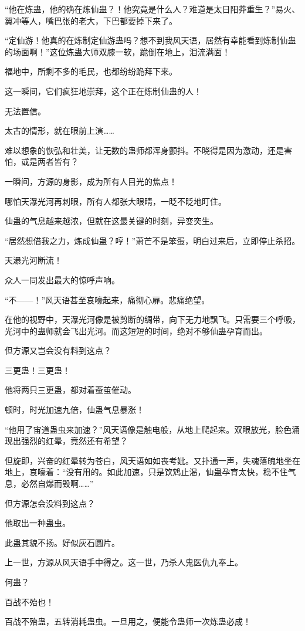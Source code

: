 \begin{this_body}
“他在炼蛊，他的确在炼仙蛊？！他究竟是什么人？难道是太日阳莽重生？”易火、翼冲等人，嘴巴张的老大，下巴都要掉下来了。

“定仙游！他真的在炼制定仙游蛊吗？想不到我风天语，居然有幸能看到炼制仙蛊的场面啊！”这位炼蛊大师双膝一软，跪倒在地上，泪流满面！

福地中，所剩不多的毛民，也都纷纷跪拜下来。

这一瞬间，它们疯狂地崇拜，这个正在炼制仙蛊的人！

无法置信。

太古的情形，就在眼前上演……

难以想象的恢弘和壮美，让无数的蛊师都浑身颤抖。不晓得是因为激动，还是害怕，或是两者皆有？

一瞬间，方源的身影，成为所有人目光的焦点！

哪怕天瀑光河再刺眼，所有人都张大眼睛，一眨不眨地盯住。

仙蛊的气息越来越浓，但就在这最关键的时刻，异变突生。

“居然想借我之力，炼成仙蛊？哼！”萧芒不是笨蛋，明白过来后，立即停止杀招。

天瀑光河断流！

众人一同发出最大的惊呼声响。

“不——！”风天语甚至哀嚎起来，痛彻心扉。悲痛绝望。

在他的视野中，天瀑光河像是被剪断的绸带，向下无力地飘飞。只需要三个呼吸，光河中的蛊师就会飞出光河。而这短短的时间，绝对不够仙蛊孕育而出。

但方源又岂会没有料到这点？

三更蛊！三更蛊！

他将两只三更蛊，都对着蚕茧催动。

顿时，时光加速九倍，仙蛊气息暴涨！

“他用了宙道蛊虫来加速？”风天语像是触电般，从地上爬起来。双眼放光，脸色涌现出强烈的红晕，竟然还有希望？

但旋即，兴奋的红晕转为苍白，风天语如如丧考妣。又扑通一声，失魂落魄地坐在地上，哀嚎着：“没有用的。如此加速，只是饮鸩止渴，仙蛊孕育太快，稳不住气息，必然自爆而毁啊……”

但方源怎会没料到这点？

他取出一种蛊虫。

此蛊其貌不扬。好似灰石圆片。

上一世，方源从风天语手中得之。这一世，乃杀人鬼医仇九奉上。

何蛊？

百战不殆也！

百战不殆蛊，五转消耗蛊虫。一旦用之，便能令蛊师一次炼蛊必成！


\end{this_body}
